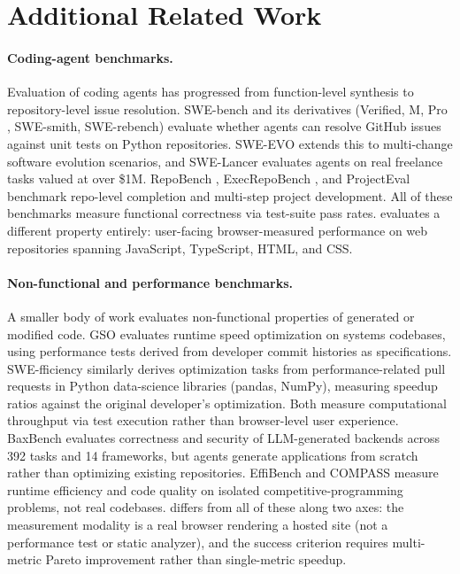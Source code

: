 \section{Additional Related Work}

\paragraph{Coding-agent benchmarks.}
Evaluation of coding agents has progressed from function-level synthesis \citep{chen2021codex,austin2021programsynthesislargelanguage} to repository-level issue resolution. SWE-bench \citep{jimenez2024swebenchlanguagemodelsresolve} and its derivatives (Verified, M, Pro \cite{deng2025swe}, SWE-smith, SWE-rebench) evaluate whether agents can resolve GitHub issues against unit tests on Python repositories. SWE-EVO \cite{thai2025swe} extends this to multi-change software evolution scenarios, and SWE-Lancer \cite{miserendino2025swe} evaluates agents on real freelance tasks valued at over \$1M. RepoBench \cite{liu2023repobench}, ExecRepoBench \cite{yang2024execrepobench}, and ProjectEval \cite{liu2025projecteval} benchmark repo-level completion and multi-step project development. All of these benchmarks measure functional correctness via test-suite pass rates. \OurBench evaluates a different property entirely: user-facing browser-measured performance on web repositories spanning JavaScript, TypeScript, HTML, and CSS.

\paragraph{Non-functional and performance benchmarks.}
A smaller body of work evaluates non-functional properties of generated or modified code. GSO \cite{XXX_gso} evaluates runtime speed optimization on systems codebases, using performance tests derived from developer commit histories as specifications. SWE-fficiency \cite{XXX_swefficiency} similarly derives optimization tasks from performance-related pull requests in Python data-science libraries (pandas, NumPy), measuring speedup ratios against the original developer's optimization. Both measure computational throughput via test execution rather than browser-level user experience. BaxBench \cite{XXX_baxbench} evaluates correctness and security of LLM-generated backends across 392 tasks and 14 frameworks, but agents generate applications from scratch rather than optimizing existing repositories. EffiBench \cite{huang2024effibench} and COMPASS \cite{meaden2025compass} measure runtime efficiency and code quality on isolated competitive-programming problems, not real codebases. \OurBench differs from all of these along two axes: the measurement modality is a real browser rendering a hosted site (not a performance test or static analyzer), and the success criterion requires multi-metric Pareto improvement rather than single-metric speedup.

